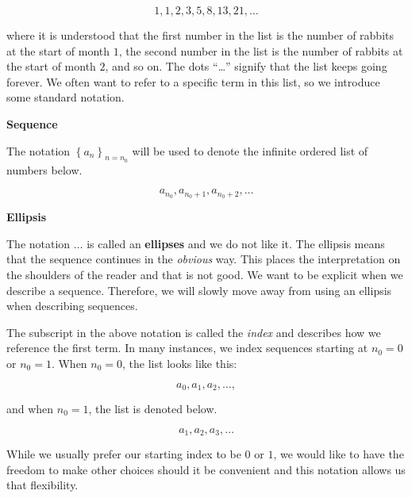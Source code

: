 \documentclass{ximera}
\begin{document}
\[
1,1,2,3,5,8,13,21, \ldots 
\]

where it is understood that the first number in the list is the number of rabbits at the start of month $1$, the second number in the list is the number of rabbits at the start of month $2$, and so on.  The dots ``\ldots'' signify that the list keeps going forever.  We often want to refer to a specific term in this list, so we introduce some standard notation.







\begin{notation} \textbf{\textcolor{blue!75!black}{Sequence}} 


The notation $\left\{a_n\right\}_{n=n_0}$ will be used to denote the infinite ordered list of numbers below.

\[
a_{n_0}, a_{n_0+1},  a_{n_0+2}, \ldots
\]

\end{notation}





\begin{warning} \textbf{\textcolor{red!80!black}{Ellipsis}} 


The notation $\ldots$ is called an \textbf{ellipses} and we do not like it.  The ellipsis means that the sequence continues in the \textit{obvious} way.  This places the interpretation on the shoulders of the reader and that is not good.  We want to be explicit when we describe a sequence.  Therefore, we will slowly move away from using an ellipsis when describing sequences.

\end{warning}






The subscript in the above notation is called the \emph{index} and describes how we reference the first term.  In many instances, we index sequences starting at $n_0=0$ or $n_0=1$.  When $n_0=0$, the list looks like this:

\[
a_0,a_1,a_2, \ldots ,
\]

and when $n_0=1$, the list is denoted below.

\[
a_1,a_2,a_3, \ldots 
\]


While we usually prefer our starting index to be $0$ or $1$, we would like to have the freedom to make other choices should it be convenient and this notation allows us that flexibility.  
\end{document}
